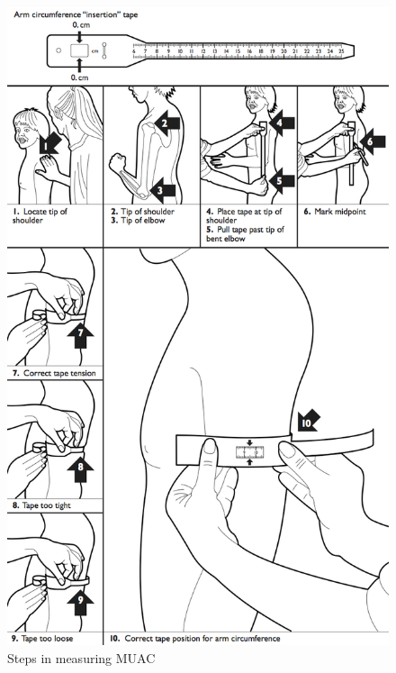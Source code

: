 \documentclass[12pt,]{book}
\theoremstyle{definition}
\theoremstyle{definition}
\theoremstyle{definition}
\theoremstyle{remark}
\begin{document}
\begin{figure}

{\centering \includegraphics[width=10.96in]{images/muac02} 

}

\caption{Steps in measuring MUAC}\label{fig:muac2}
\end{figure}
\end{document}
